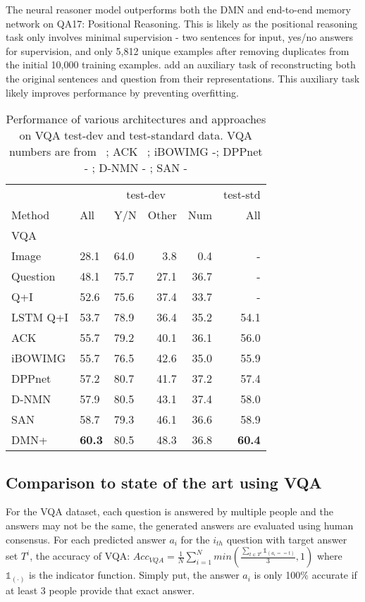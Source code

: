 \documentclass{article}
\begin{document}
The neural reasoner model outperforms both the DMN and end-to-end memory network on QA17: Positional Reasoning.
This is likely as the positional reasoning task only involves minimal supervision - two sentences for input, yes/no answers for supervision, and only 5,812 unique examples after removing duplicates from the initial 10,000 training examples.
\citet{Peng2015} add an auxiliary task of reconstructing both the original sentences and question from their representations.
This auxiliary task likely improves performance by preventing overfitting.



\begin{table}[t!]

\centering
\setlength{\tabcolsep}{.5em}
\begin{tabular}{lllrrr}
\hline
\multicolumn{1}{c}{}&
\multicolumn{4}{c}{test-dev}&
\multicolumn{1}{r}{test-std}\\
\cline{2-5}
Method&All&Y/N&Other&Num&All\\
\hline
VQA& & & & &\\
Image&28.1&64.0 &3.8 &0.4 &-\\
Question &48.1&75.7 &27.1 &36.7&-\\
Q+I&52.6&75.6 &37.4 &33.7 &-\\
LSTM Q+I&53.7&78.9 &36.4 &35.2 &54.1\\
\hline
ACK&55.7&79.2 &40.1 &36.1 &56.0\\
iBOWIMG&55.7&76.5 &42.6 &35.0 &55.9\\
DPPnet&57.2&80.7 &41.7 &37.2 &57.4\\
D-NMN&57.9&80.5 &43.1 &37.4 &58.0\\
SAN&58.7&79.3 &46.1 &36.6 &58.9\\
\hline
DMN+&\textbf{60.3}&80.5 &48.3 &36.8 &\textbf{60.4}\\
\end{tabular}
\caption{Performance of various architectures and approaches on VQA test-dev and test-standard data. VQA numbers are from ~\citet{Antol2015};  ACK ~\citet{wu2015ask}; iBOWIMG -\citet{Zhou2015}; DPPnet - \citet{noh2015image}; D-NMN - \citet{andreas2016learning}; SAN -\citet{yang2015stacked} }
\label{quantitative}
\end{table}


\subsection{Comparison to state of the art using VQA} \label{sec:vqa-sota}
For the VQA dataset, each question is answered by multiple people and the answers may not be the same, the generated answers are evaluated using human consensus.
For each predicted answer $a_i$ for the $i_{th}$ question with target answer set $T^{i}$, the accuracy of VQA:
$Acc_{VQA} = \frac{1}{N}\sum_{i=1}^Nmin(\frac{\sum_{t\in T^i}\mathds{1}_{(a_i==t)}}{3},1)$
where $\mathds{1}_{(\cdot)}$ is the indicator function. Simply put, the answer $a_i$ is only 100$\%$ accurate if at least 3 people provide that exact answer.
\end{document}
